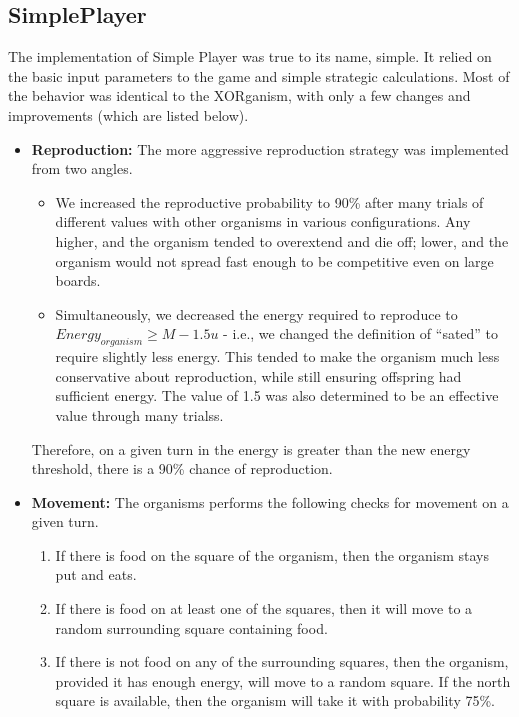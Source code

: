 \documentclass[
10pt, %
letterpaper, %
oneside, %
headinclude,footinclude, %
english
]{article}
\begin{document}
\subsection{SimplePlayer}
The implementation of Simple Player was true to its name, simple. It relied on the basic input parameters to the game and simple strategic calculations. Most of the behavior was identical to the XORganism, with only a few changes and improvements (which are listed below).

\begin{itemize}
  \item \textbf{Reproduction:} The more aggressive reproduction strategy was implemented from two angles.
    \begin{itemize}
      \item We increased the reproductive probability to 90\% after many trials of different values with other organisms in various configurations. Any higher, and the organism tended to overextend and die off; lower, and the organism would not spread fast enough to be competitive even on large boards.
      \item Simultaneously, we decreased the energy required to reproduce to $Energy_{organism} \geq M - 1.5 u$ - i.e., we changed the definition of ``sated'' to require slightly less energy. This tended to make  the organism much less conservative about reproduction, while still ensuring offspring had sufficient energy. The value of 1.5 was also determined to be an effective value through many trialss.
    \end{itemize}
    Therefore, on a given turn in the energy is greater than the new energy threshold, there is a 90\% chance of reproduction.
  \item \textbf{Movement:} The organisms performs the following checks for movement on a given turn.
  \begin{enumerate}
    \item If there is food on the square of the organism, then the organism stays put and eats.
    \item   If there is food on at least one of the squares, then it will move to a random surrounding square containing food.
    \item  If there is not food on any of the surrounding squares, then the organism, provided it has enough energy, will move to a random square. If the north square is available, then the organism will take it with probability 75\%.
  \end{enumerate}
\end{itemize}
\end{document}
